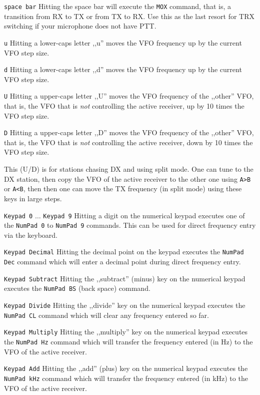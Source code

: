 \documentclass[12pt]{book}
\def\rett#1{\texttt{\color{red}#1}}
\def\bltt#1{\texttt{\color{blue}#1}}
\begin{document}
\rett{space bar} Hitting the space bar will execute the \bltt{MOX} command, that is, a
transition from RX to TX or from TX to RX. Use this as the last resort for TRX switching
if your microphone does not have PTT.

\rett{u} Hitting a lower-caps letter ,,u'' moves the VFO frequency up by the current VFO
step size.

\rett{d} Hitting a lower-caps letter ,,d'' moves the VFO frequency up by the current VFO
step size.

\rett{U} Hitting a upper-caps letter ,,U'' moves the VFO frequency of the ,,other'' VFO, that is,
the VFO that is \textit{not} controlling the active receiver, up by 10 times the VFO step size.

\rett{D} Hitting a upper-caps letter ,,D'' moves the VFO frequency of the ,,other'' VFO, that is,
the VFO that is \textit{not} controlling the active receiver, down by 10 times the VFO step size.

This (U/D) is for stations chasing DX and using split mode. One can tune to the DX station,
then copy the VFO of the active receiver to the other one using \bltt{A>B} or \bltt{A<B}, then then
one can  move the TX frequency (in split mode) using these keys in large steps.

\rett{Keypad 0} $\ldots$ \rett{Keypad 9} Hitting a digit on the numerical keypad executes one of the
\bltt{NumPad 0} to \bltt{NumPad 9} commands. This can be used for direct frequency entry
via the keyboard.

\rett{Keypad Decimal} Hitting the decimal point on the keypad executes the \bltt{NumPad Dec}
command which will enter a decimal point during direct frequency entry.

\rett{Keypad Subtract} Hitting the ,,subtract'' (minus) key on the numerical keypad executes the
\bltt{NumPad BS} (back space) command.

\rett{Keypad Divide} Hitting the ,,divide'' key on the numerical keypad executes the \bltt{NumPad CL}
command which will clear any frequency entered so far.

\rett{Keypad Multiply} Hitting the ,,multiply'' key on the numerical keypad executes the \bltt{NumPad Hz}
command which will transfer the frequency entered (in Hz) to the VFO of the active receiver.

\rett{Keypad Add} Hitting the ,,add'' (plus) key on the numerical keypad executes the \bltt{NumPad kHz}
command which will transfer the frequency entered (in kHz) to the VFO of the active receiver.
\end{document}
